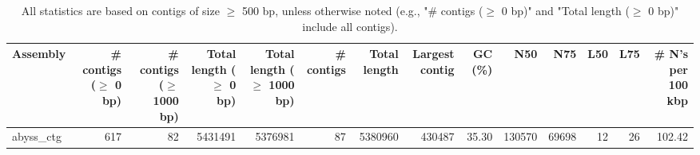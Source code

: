 \documentclass[12pt,a4paper]{article}
\begin{document}
\begin{table}[ht]
\begin{center}
\caption{All statistics are based on contigs of size $\geq$ 500 bp, unless otherwise noted (e.g., "\# contigs ($\geq$ 0 bp)" and "Total length ($\geq$ 0 bp)" include all contigs).}
\begin{tabular}{|l*{13}{|r}|}
\hline
Assembly & \# contigs ($\geq$ 0 bp) & \# contigs ($\geq$ 1000 bp) & Total length ($\geq$ 0 bp) & Total length ($\geq$ 1000 bp) & \# contigs & Total length & Largest contig & GC (\%) & N50 & N75 & L50 & L75 & \# N's per 100 kbp \\ \hline
abyss\_ctg & 617 & 82 & 5431491 & 5376981 & 87 & 5380960 & 430487 & 35.30 & 130570 & 69698 & 12 & 26 & 102.42 \\ \hline
\end{tabular}
\end{center}
\end{table}
\end{document}
